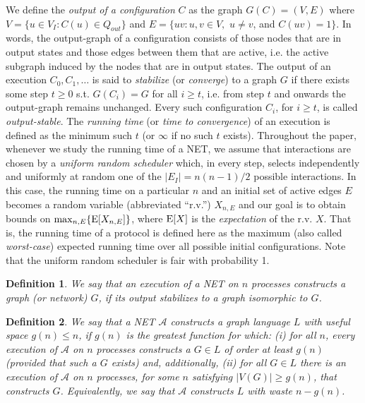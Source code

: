 \documentclass[preprint]{elsarticle}
\newcommand{\ca}{\mathcal{A}}
\newcommand{\E}{\textup{E}}
\newtheorem{definition}{Definition}
\begin{document}
We define the \emph{output of a configuration} $C$ as the graph $G(C)=(V,E)$ where $V=\{u\in V_I: C(u)\in Q_{out}\}$ and $E=\{uv:u,v\in V,$ $u\neq v$, and $C(uv)=1\}$. In words, the output-graph of a configuration consists of those nodes that are in output states and those edges between them that are active, i.e. the active subgraph induced by the nodes that are in output states. The output of an execution $C_0,C_1,\ldots$ is said to \emph{stabilize} (or \emph{converge}) to a graph $G$ if there exists some step $t\geq 0$ s.t. $G(C_i)=G$ for all $i\geq t$, i.e. from step $t$ and onwards the output-graph remains unchanged. Every such configuration $C_i$, for $i\geq t$, is called \emph{output-stable}. The \emph{running time} (or \emph{time to convergence}) of an execution is defined as the minimum such $t$ (or $\infty$ if no such $t$ exists). Throughout the paper, whenever we study the running time of a NET, we assume that interactions are chosen by a \emph{uniform random scheduler} which, in every step, selects independently and uniformly at random one of the $|E_I|=n(n-1)/2$ possible interactions. In this case, the running time on a particular $n$ and an initial set of active edges $E$ becomes a random variable (abbreviated ``r.v.'') $X_{n,E}$ and our goal is to obtain bounds on $\max_{n,E}\{\E[X_{n,E}]\}$, where $\E[X]$ is the \emph{expectation} of the r.v. $X$. That is, the running time of a protocol is defined here as the maximum (also called \emph{worst-case}) expected running time over all possible initial configurations. Note that the uniform random scheduler is fair with probability 1.

\begin{definition}
We say that an execution of a NET on $n$ processes \emph{constructs a graph} (or \emph{network}) $G$, if its output stabilizes to a graph isomorphic to $G$.
\end{definition}

\begin{definition}
We say that a NET $\ca$ \emph{constructs a graph language $L$ with useful space $g(n)\leq n$}, if $g(n)$ is the greatest function for which: (i) for all $n$, every execution of $\ca$ on $n$ processes constructs a $G\in L$ of order at least $g(n)$ (provided that such a $G$ exists) and, additionally, (ii) for all $G\in L$ there is an execution of $\ca$ on $n$ processes, for some $n$ satisfying $|V(G)|\geq g(n)$, that constructs $G$. Equivalently, we say that \emph{$\ca$ constructs $L$ with waste $n-g(n)$}.
\end{definition}
\end{document}

